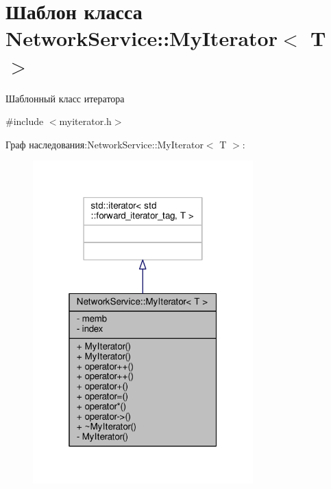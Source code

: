 \hypertarget{class_network_service_1_1_my_iterator}{}\section{Шаблон класса Network\+Service\+:\+:My\+Iterator$<$ T $>$}
\label{class_network_service_1_1_my_iterator}


Шаблонный класс итератора  




{\ttfamily \#include $<$myiterator.\+h$>$}



Граф наследования\+:Network\+Service\+:\+:My\+Iterator$<$ T $>$\+:\nopagebreak
\begin{figure}[H]
\begin{center}
\leavevmode
\includegraphics[width=241pt]{class_network_service_1_1_my_iterator__inherit__graph}
\end{center}
\end{figure}


